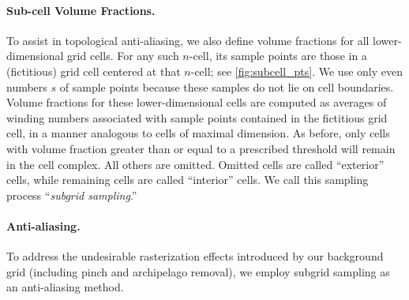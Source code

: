\paragraph{Sub-cell Volume Fractions.}
To assist in topological anti-aliasing, we also define volume fractions for all lower-dimensional grid cells.
For any such $n$-cell, its sample points are those in a (fictitious) grid cell centered at that $n$-cell; see \cref{fig:subcell_pts}.
We use only even numbers $s$ of sample points because these samples do not lie on cell boundaries.
Volume fractions for these lower-dimensional cells are computed as averages of winding numbers associated with sample points contained in the fictitious grid cell, in a manner analogous to cells of maximal dimension.
As before, only cells with volume fraction greater than or equal to a prescribed threshold will remain in the cell complex. All others are omitted.
Omitted cells are called ``exterior'' cells, while remaining cells are called ``interior'' cells.
We call this sampling process ``\emph{subgrid sampling}.''



\paragraph{Anti-aliasing.}
To address the undesirable rasterization effects introduced by our background grid (including pinch and archipelago removal), we employ subgrid sampling as an anti-aliasing method.



